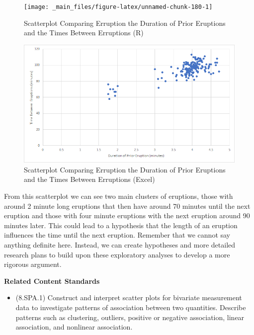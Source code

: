 \documentclass[
]{book}
\providecommand{\tightlist}{%
  \setlength{\itemsep}{0pt}\setlength{\parskip}{0pt}}
\newenvironment{standards}{}{}
\theoremstyle{definition}
\theoremstyle{definition}
\theoremstyle{definition}
\theoremstyle{definition}
\theoremstyle{remark}
\begin{document}
\begin{figure}

{\centering \texttt{[image: \_main\_files/figure-latex/unnamed-chunk-180-1]} 

}

\caption{Scatterplot Comparing Erruption the Duration of Prior Eruptions and the Times Between Erruptions (R)}\label{fig:unnamed-chunk-180}
\end{figure}

\begin{figure}

{\centering \includegraphics[width=0.9\linewidth]{data-examples/Old-Faithful/Eruption-Scatter-Excel} 

}

\caption{Scatterplot Comparing Erruption the Duration of Prior Eruptions and the Times Between Erruptions (Excel)}\label{fig:unnamed-chunk-181}
\end{figure}

From this scatterplot we can see two main clusters of eruptions, those with around 2 minute long eruptions that then have around 70 minutes until the next eruption and those with four minute eruptions with the next eruption around 90 minutes later. This could lead to a hypothesis that the length of an eruption influences the time until the next eruption. Remember that we cannot say anything definite here. Instead, we can create hypotheses and more detailed research plans to build upon these exploratory analyses to develop a more rigorous argument.

\begin{standards}

\begin{center}
\textbf{Related Content Standards}

\end{center}

\begin{itemize}
\tightlist
\item
  (8.SPA.1) Construct and interpret scatter plots for bivariate measurement data to investigate patterns of association between two quantities. Describe patterns such as clustering, outliers, positive or negative association, linear association, and nonlinear association.
\end{itemize}

\end{standards}
\end{document}
